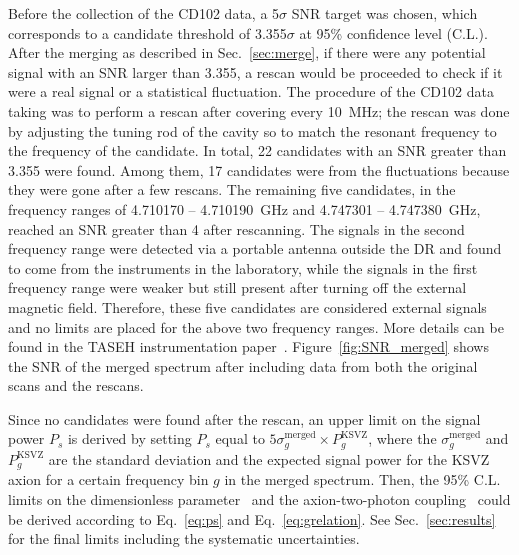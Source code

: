 Before the collection of the CD102 data, a 5$\sigma$ SNR target was chosen, 
which corresponds to a candidate threshold of 3.355$\sigma$ at 95\% 
confidence level (C.L.).
 After the merging as described in Sec.~\ref{sec:merge}, if there were 
any potential signal with an SNR larger than 
3.355, a rescan would be proceeded to check if it were a real signal 
or a statistical fluctuation. 
The procedure of the CD102 data taking was to perform a rescan after 
covering every 10~MHz; the rescan was done by adjusting the tuning rod of the 
cavity so to match the resonant frequency to the frequency of the candidate. 
In total, 22 candidates with an SNR greater than 3.355 were found. 
Among them, 17 candidates were from the fluctuations because they were gone 
after a few rescans. 
The remaining five candidates, in the frequency ranges of 
4.710170 -- 4.710190~GHz and 4.747301 -- 4.747380~GHz, reached an SNR greater than 
4 after rescanning. The signals in the second frequency 
range were detected via a portable antenna outside the DR and found 
to come from the instruments in the laboratory, while the signals 
in the first frequency range were weaker but still present after 
turning off the external magnetic field. 
Therefore, these five candidates are considered external signals and 
no limits are placed for the above two frequency ranges.  
More details can be found in the 
TASEH instrumentation paper~\cite{TASEHInstrumentation}. 
Figure~\ref{fig:SNR_merged} shows the SNR of the merged spectrum after 
including data from both the original scans and the rescans. 

Since no candidates were found after the rescan, an upper limit on 
the signal power $P_s$ is derived by setting $P_s$ equal to 
$5\sigma_{g}^\text{merged}\times P_{g}^\text{KSVZ}$, where 
the $\sigma_{g}^\text{merged}$ and $P_{g}^\text{KSVZ}$ are 
the standard deviation and the expected signal power for the KSVZ axion 
for a certain frequency bin $g$ in the merged spectrum. 
Then, the 95\% C.L. limits on the dimensionless parameter 
\ggamma\ and the axion-two-photon coupling \gagg\ could be derived 
according to Eq.~\eqref{eq:ps} and Eq.~\eqref{eq:grelation}. 
See Sec.~\ref{sec:results} for the final limits including the systematic 
uncertainties.

